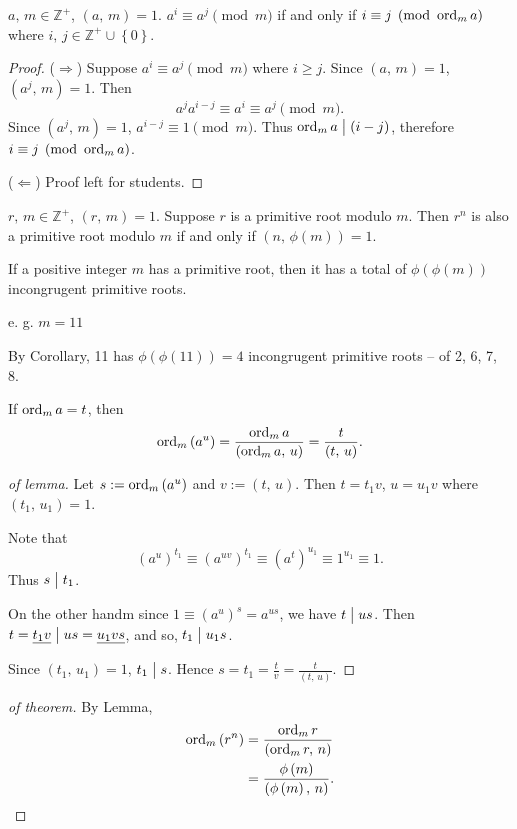 \begin{theorem}
    $a,\,m \in \mathbb{Z}^+$, $\left(a,\,m\right)=1$.
    $a^i \equiv a^j \pmod{m}$ if and only if $i \equiv j \pmod{\operatorname{\mathrm{ord}}_m a}$ where
    $i,\,j \in \mathbb{Z}^+ \cup \left\{0\right\}$.
\end{theorem}
\begin{proof}
    ($\Rightarrow$) Suppose $a^i \equiv a^j \pmod{m}$ where $i \geq j$. Since
    $\left(a,\,m\right)=1$, $\left(a^j,\,m\right)=1$. Then
    \[
        a^ja^{i-j} \equiv a^i \equiv a^j \pmod{m}.
    \]
    Since $\left(a^j,\,m\right)=1$, $a^{i-j}\equiv 1 \pmod{m}$.
    Thus $\operatorname{\mathrm{ord}}_m a \bigm| \left(i-j\right)$, therefore $i \equiv j \pmod{\operatorname{\mathrm{ord}}_m a}$.

    ($\Leftarrow$) Proof left for students.
\end{proof}

\begin{theorem}
    $r,\,m \in \mathbb{Z}^+$, $\left(r,\,m\right)=1$.
    Suppose $r$ is a primitive root modulo $m$. Then $r^n$ is also a 
    primitive root modulo $m$ if and only if $\left(n,\,\phi\left(m\right)\right)=1$.
\end{theorem}

\begin{corollary}
    If a positive integer $m$ has a primitive root, then it has a total of
    \underline{$\phi\left(\phi\left(m\right)\right)$} incongrugent primitive roots.
\end{corollary}

e. g. $m=11$

By Corollary, 11 has $\phi\left(\phi\left(11\right)\right)=4$ incongrugent
primitive roots -- of 2, 6, 7, 8.

\begin{lemma}
    If $\operatorname{\mathrm{ord}}_m a = t$, then \[\operatorname{\mathrm{ord}}_m \left(a^u\right) = \frac{\operatorname{\mathrm{ord}}_m a}{\left(\operatorname{\mathrm{ord}}_m a,\,u\right)} = \frac{t}{\left(t,\,u\right)}.\]
\end{lemma}

\begin{proof}[of lemma]
    Let $s:=\operatorname{\mathrm{ord}}_m\left(a^u\right)$ and $v:=\left(t,\,u\right)$. Then
    $t=t_1 v$, $u=u_1 v$ where $\left(t_1,\,u_1\right)=1$.

    Note that
    \[
        \left(a^u\right)^{t_1} \equiv \left(a^{uv}\right)^{t_1}
        \equiv \left(a^t\right)^{u_1} \equiv 1^{u_1} \equiv 1.
    \]
    Thus $s \bigm| t_1$.

    On the other handm since $1\equiv\left(a^u\right)^s =a^{us}$, we have $t \bigm| us$.
    Then $t=\underline{t_1 v} \bigm| us = \underline{u_1 vs}$, and so, $t_1 \bigm| u_1s$.

    Since $\left(t_1,\,u_1\right)=1$, $t_1 \bigm| s$. Hence $s=t_1=\frac{t}{v}=\frac{t}{\left(t,\,u\right)}$.
\end{proof}

\begin{proof}[of theorem]
    By Lemma,
    \begin{align*}
        \operatorname{\mathrm{ord}}_m \left(r^n\right) &= \frac{\operatorname{\mathrm{ord}}_m r}{\left(\operatorname{\mathrm{ord}}_m r,\,n\right)} \\
        &= \frac{\phi\left(m\right)}{\left(\phi\left(m\right),\,n\right)}.
    \end{align*}
\end{proof}